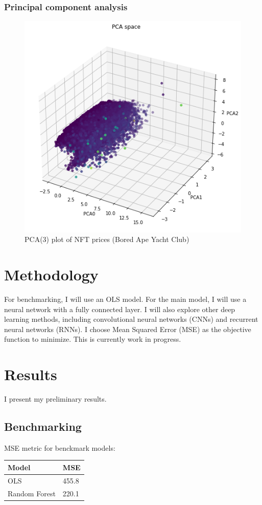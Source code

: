 \documentclass[12pt]{article}
\begin{document}
\subsubsection{Principal component analysis}
\begin{figure}[H]
    \includegraphics[width=\textwidth]{../figures/pca_1.png}
    \caption{PCA(3) plot of NFT prices (Bored Ape Yacht Club)}
\end{figure}

\section{Methodology}
\label{sec: method}
For benchmarking, I will use an OLS model. For the main model, I will use a neural network with a fully connected layer. I will also explore other deep learning methods, including convolutional neural networks (CNNs) and recurrent neural networks (RNNs). I choose Mean Squared Error (MSE) as the objective function to minimize. This is currently work in progress.


\section{Results}
\label{sec: results}
I present my preliminary results.
\subsection{Benchmarking}
MSE metric for benckmark models:
\begin{table}[H]
    \centering
\begin{tabular}{|p{8em}|p{8em}|}
    \hline
    \textbf{Model} & \textbf{MSE} \\ \hline
    OLS & 455.8 \\ \hline
    Random Forest & 220.1 \\ \hline
\end{tabular}
\end{table}
\end{document}
